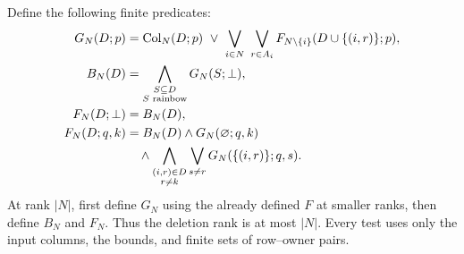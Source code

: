 Define the following finite predicates:
\begin{align}
 G_N(D;p)&=\operatorname{Col}_N(D;p)
   \ \lor\ \bigvee_{i\in N}\ \bigvee_{r\in A_i}
        F_{N\setminus\{i\}}(D\cup\{(i,r)\};p),
        \label{core:eq:peel-generators}\\
 B_N(D)&=\bigwedge_{\substack{S\subseteq D\\S\text{ rainbow}}}
                  G_N(S;\bot),
        \label{core:eq:peel-rainbow}\\
 F_N(D;\bot)&=B_N(D),\notag\\
 F_N(D;q,k)&=B_N(D)\land G_N(\varnothing;q,k)\notag\\
 &\quad\land\bigwedge_{\substack{(i,r)\in D\\r\ne k}}
                  \bigvee_{s\ne r}G_N(\{(i,r)\};q,s).
        \label{core:eq:peel-feasible}
\end{align}
At rank $|N|$, first define $G_N$ using the already defined $F$ at
smaller ranks, then define $B_N$ and $F_N$. Thus the deletion rank is
at most $|N|$. Every test uses only the input columns, the bounds,
and finite sets of row--owner pairs.

